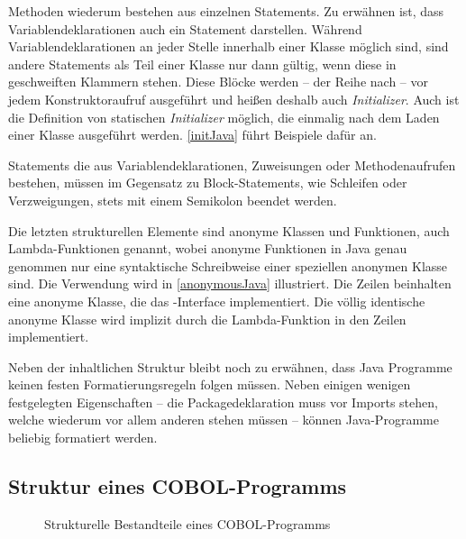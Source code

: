 Methoden wiederum bestehen aus einzelnen Statements. Zu erwähnen ist, dass Variablendeklarationen auch ein Statement darstellen. Während Variablendeklarationen an jeder Stelle innerhalb einer Klasse möglich sind, sind andere Statements als Teil einer Klasse nur dann gültig, wenn diese in geschweiften Klammern stehen. Diese Blöcke werden -- der Reihe nach -- vor jedem Konstruktoraufruf ausgeführt und heißen deshalb auch \textit{Initializer}. Auch ist die Definition von statischen \textit{Initializer} möglich, die einmalig nach dem Laden einer Klasse ausgeführt werden. \autoref{initJava} führt Beispiele dafür an.


Statements die aus Variablendeklarationen, Zuweisungen oder Methodenaufrufen bestehen, müssen im Gegensatz zu Block-Statements, wie \zB Schleifen oder Verzweigungen, stets mit einem Semikolon beendet werden. 

Die letzten strukturellen Elemente sind anonyme Klassen und Funktionen, auch Lambda-Funktionen genannt, wobei anonyme Funktionen in Java genau genommen nur eine syntaktische Schreibweise einer speziellen anonymen Klasse sind. Die Verwendung wird in \autoref{anonymousJava} illustriert. Die Zeilen  beinhalten eine anonyme Klasse, die das -Interface implementiert. Die völlig identische  anonyme Klasse wird implizit durch die Lambda-Funktion in den Zeilen  implementiert.


Neben der inhaltlichen Struktur bleibt noch zu erwähnen, dass Java Programme keinen festen Formatierungsregeln folgen müssen. Neben einigen wenigen festgelegten Eigenschaften -- die Packagedeklaration muss vor Imports stehen, welche wiederum vor allem anderen stehen müssen -- können Java-Programme beliebig formatiert werden.

\subsection*{Struktur eines COBOL-Programms}\label{cobolstructure}

\begin{figure}[H]
    \centering
    \resizebox{.9\linewidth}{!}{\unskip}
    \caption{Strukturelle Bestandteile eines COBOL-Programms \label{cobolStructureDiagram}}
\end{figure}

